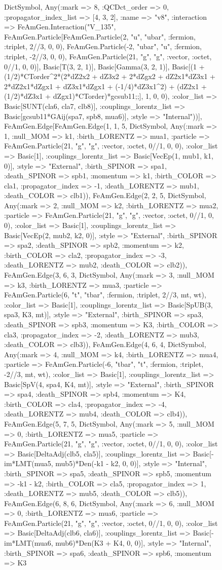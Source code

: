 \documentclass{revtex4}
\begin{document}
\begin{figure}[!htb]
\begin{center}
{Dict{Symbol, Any}(:mark => 8, :QCDct_order => 0, :propagator_index_list => [4, 3, 2], :name => "v8", :interaction => FeAmGen.Interaction("V_135", FeAmGen.Particle[FeAmGen.Particle(2, "u", "ubar", :fermion, :triplet, 2//3, 0, 0), FeAmGen.Particle(-2, "ubar", "u", :fermion, :triplet, -2//3, 0, 0), FeAmGen.Particle(21, "g", "g", :vector, :octet, 0//1, 0, 0)], Basic[T(3, 2, 1)], Basic[Gamma(3, 2, 1)], Basic[(1 + (1/2)*CTorder^2*(2*dZ2x2 + dZ3x2 + 2*dZgx2 + dZ2x1*dZ3x1 + 2*dZ2x1*dZgx1 + dZ3x1*dZgx1 + (-1/4)*dZ3x1^2) + (dZ2x1 + (1/2)*dZ3x1 + dZgx1)*CTorder)*gcsub11;;], 1, 0, 0), :color_list => Basic[SUNT(cla6, cla7, clb8)], :couplings_lorentz_list => Basic[gcsub11*GAij(spa7, spb8, mua6)], :style => "Internal"))], FeAmGen.Edge[FeAmGen.Edge(1, 1, 5, Dict{Symbol, Any}(:mark => 1, :null_MOM => k1, :birth_LORENTZ => mua1, :particle => FeAmGen.Particle(21, "g", "g", :vector, :octet, 0//1, 0, 0), :color_list => Basic[1], :couplings_lorentz_list => Basic[VecEp(1, mub1, k1, 0)], :style => "External", :birth_SPINOR => spa1, :death_SPINOR => spb1, :momentum => k1, :birth_COLOR => cla1, :propagator_index => -1, :death_LORENTZ => mub1, :death_COLOR => clb1)), FeAmGen.Edge(2, 2, 5, Dict{Symbol, Any}(:mark => 2, :null_MOM => k2, :birth_LORENTZ => mua2, :particle => FeAmGen.Particle(21, "g", "g", :vector, :octet, 0//1, 0, 0), :color_list => Basic[1], :couplings_lorentz_list => Basic[VecEp(2, mub2, k2, 0)], :style => "External", :birth_SPINOR => spa2, :death_SPINOR => spb2, :momentum => k2, :birth_COLOR => cla2, :propagator_index => -3, :death_LORENTZ => mub2, :death_COLOR => clb2)), FeAmGen.Edge(3, 6, 3, Dict{Symbol, Any}(:mark => 3, :null_MOM => k3, :birth_LORENTZ => mua3, :particle => FeAmGen.Particle(6, "t", "tbar", :fermion, :triplet, 2//3, mt, wt), :color_list => Basic[1], :couplings_lorentz_list => Basic[SpUB(3, spa3, K3, mt)], :style => "External", :birth_SPINOR => spa3, :death_SPINOR => spb3, :momentum => K3, :birth_COLOR => cla3, :propagator_index => -2, :death_LORENTZ => mub3, :death_COLOR => clb3)), FeAmGen.Edge(4, 6, 4, Dict{Symbol, Any}(:mark => 4, :null_MOM => k4, :birth_LORENTZ => mua4, :particle => FeAmGen.Particle(-6, "tbar", "t", :fermion, :triplet, -2//3, mt, wt), :color_list => Basic[1], :couplings_lorentz_list => Basic[SpV(4, spa4, K4, mt)], :style => "External", :birth_SPINOR => spa4, :death_SPINOR => spb4, :momentum => K4, :birth_COLOR => cla4, :propagator_index => -4, :death_LORENTZ => mub4, :death_COLOR => clb4)), FeAmGen.Edge(5, 7, 5, Dict{Symbol, Any}(:mark => 5, :null_MOM => 0, :birth_LORENTZ => mua5, :particle => FeAmGen.Particle(21, "g", "g", :vector, :octet, 0//1, 0, 0), :color_list => Basic[DeltaAdj(clb5, cla5)], :couplings_lorentz_list => Basic[-im*LMT(mua5, mub5)*Den(-k1 - k2, 0, 0)], :style => "Internal", :birth_SPINOR => spa5, :death_SPINOR => spb5, :momentum => -k1 - k2, :birth_COLOR => cla5, :propagator_index => 1, :death_LORENTZ => mub5, :death_COLOR => clb5)), FeAmGen.Edge(6, 8, 6, Dict{Symbol, Any}(:mark => 6, :null_MOM => 0, :birth_LORENTZ => mua6, :particle => FeAmGen.Particle(21, "g", "g", :vector, :octet, 0//1, 0, 0), :color_list => Basic[DeltaAdj(clb6, cla6)], :couplings_lorentz_list => Basic[-im*LMT(mua6, mub6)*Den(K3 + K4, 0, 0)], :style => "Internal", :birth_SPINOR => spa6, :death_SPINOR => spb6, :momentum => K3 }
\end{center}
\end{figure}
\end{document}
